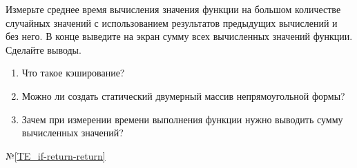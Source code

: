 \labtask

Измерьте среднее время вычисления значения функции на большом количестве случайных значений с использованием результатов предыдущих вычислений и без него.
В конце выведите на экран сумму всех вычисленных значений функции.
Сделайте выводы.

\labworkquestions

\begin{enumerate}
	\item
		Что такое кэширование?
	\item
		Можно ли создать статический двумерный массив непрямоугольной формы?
	\item
		Зачем при измерении времени выполнения функции нужно выводить сумму вычисленных значений?
\end{enumerate}

\typerrors
№\ref{TE_if-return-return}

